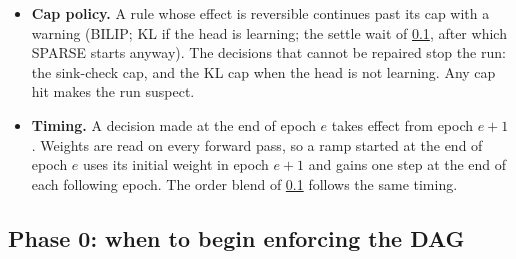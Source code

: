 \begin{itemize}[leftmargin=1.5em]
\item \textbf{Cap policy.} A rule whose effect is reversible continues past its cap
      with a warning (BILIP; KL if the head is learning; the settle wait of
      \cref{sec:schedule:phase0}, after which SPARSE starts anyway). The decisions
      that cannot be repaired stop the run: the sink-check cap, and the KL cap when
      the head is not learning. Any cap hit makes the run suspect.
\item \textbf{Timing.} A decision made at the end of epoch $e$ takes effect from epoch
      $e+1$. Weights are read on every forward pass, so a ramp started at the end of
      epoch $e$ uses its initial weight in epoch $e+1$ and gains one step at the end
      of each following epoch. The order blend of \cref{sec:schedule:phase0} follows
      the same timing.
\end{itemize}

\subsection{Phase 0: when to begin enforcing the DAG}
\label{sec:schedule:phase0}

